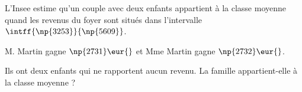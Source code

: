 \begin{exo}{}
	L'Insee estime qu'un couple avec deux enfants appartient à la classe moyenne quand les revenus du foyer sont situés dans l'intervalle $\intff{\np{3253}}{\np{5609}}$.

	M. Martin gagne $\np{2731}\eur{}$ et Mme Martin gagne $\np{2732}\eur{}$.

	Ils ont deux enfants qui ne rapportent aucun revenu. La famille appartient-elle à la classe moyenne ?
\end{exo}
